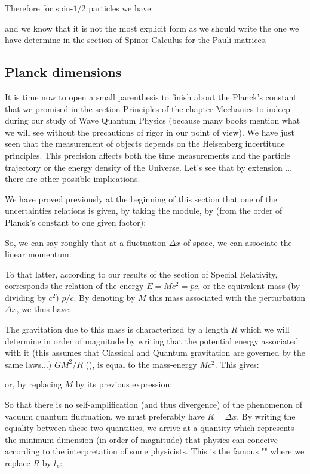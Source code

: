 	Therefore for spin-$1/2$ particles we have:
	
	and we know that it is not the most explicit form as we should write the one we have determine in the section of Spinor Calculus for the Pauli matrices.
	
	\pagebreak
	\subsection{Planck dimensions}
	It is time now to open a small parenthesis to finish about the Planck's constant that we promised in the section Principles of the chapter Mechanics to indeep during our study of Wave Quantum Physics (because many books mention what we will see without the precautions of rigor in our point of view). We have just seen that the measurement of objects depends on the Heisenberg incertitude principles. This precision affects both the time measurements and the particle trajectory or the energy density of the Universe. Let's see that by extension ... there are other possible implications.

	We have proved previously at the beginning of this section that one of the uncertainties relations is given, by taking the module, by (from the order of Planck's constant to one given factor):
	
	So, we can say roughly that at a fluctuation $\Delta x$ of space, we can associate the linear momentum:
	
	To that latter, according to our results of the section of Special Relativity, corresponds the relation of the energy $E=Mc^2=pc$, or the equivalent mass (by dividing by $c^2$) $p/c$. By denoting by $M$ this mass associated with the perturbation $\Delta x$, we thus have:
	
	The gravitation due to this mass is characterized by a length $R$ which we will determine in order of magnitude by writing that the potential energy associated with it (this assumes that Classical and Quantum gravitation are governed by the same laws...) $GM^2/R$ (), is equal to the mass-energy $Mc^2$. This gives:
	
	or, by replacing $M$ by its previous expression:
	
	So that there is no self-amplification (and thus divergence) of the phenomenon of vacuum quantum fluctuation, we must preferably have $R=\Delta x$. By writing the equality between these two quantities, we arrive at a quantity which represents the minimum dimension (in order of magnitude) that physics can conceive according to the interpretation of some physicists. This is the famous "" where we replace $R$ by $l_p$:
	

